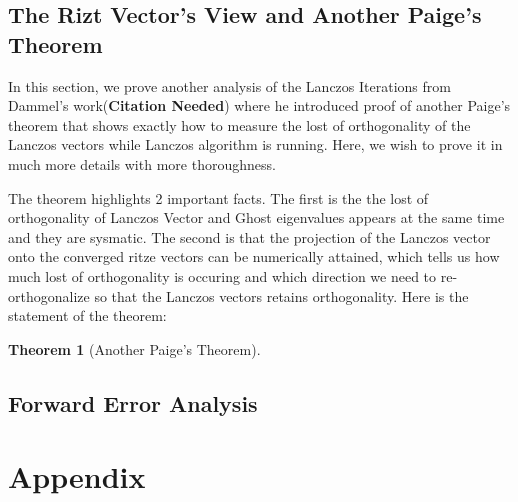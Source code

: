 \documentclass[]{article}
\theoremstyle{definition}
\newtheorem{theorem}{Theorem}            %
\begin{document}
        
    \subsection{The Rizt Vector's View and Another Paige's Theorem}
        In this section, we prove another analysis of the Lanczos Iterations from Dammel's work(\textbf{Citation Needed}) where he introduced proof of another Paige's theorem that shows exactly how to measure the lost of orthogonality of the Lanczos vectors while Lanczos algorithm is running. Here, we wish to prove it in much more details with more thoroughness.
        \par
        The theorem highlights 2 important facts. The first is the the lost of orthogonality of Lanczos Vector and Ghost eigenvalues appears at the same time and they are sysmatic. The second is that the projection of the Lanczos vector onto the converged ritze vectors can be numerically attained, which tells us how much lost of orthogonality is occuring and which direction we need to re-orthogonalize so that the Lanczos vectors retains orthogonality. Here is the statement of the theorem: 
        \begin{theorem}[Another Paige's Theorem]
            
        \end{theorem}
    \subsection{Forward Error Analysis}


\newpage
\section{Appendix}
\end{document}
